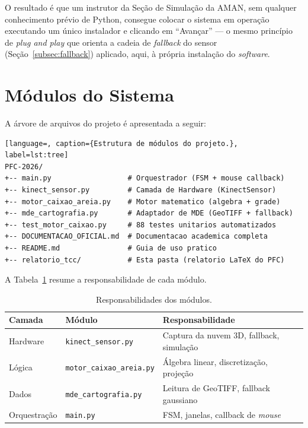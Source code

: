 \noindent O resultado é que um instrutor da Seção de Simulação da AMAN,
sem qualquer conhecimento prévio de Python, consegue colocar o sistema
em operação executando um único instalador e clicando em ``Avançar'' —
o mesmo princípio de \textit{plug and play} que orienta a cadeia de
\textit{fallback} do sensor (Seção~\ref{subsec:fallback}) aplicado,
aqui, à própria instalação do \textit{software}.

\section{Módulos do Sistema}
\label{sec:modulos}

A árvore de arquivos do projeto é apresentada a seguir:

\begin{lstlisting}[language=, caption={Estrutura de módulos do projeto.}, label=lst:tree]
PFC-2026/
+-- main.py                  # Orquestrador (FSM + mouse callback)
+-- kinect_sensor.py         # Camada de Hardware (KinectSensor)
+-- motor_caixao_areia.py    # Motor matematico (algebra + grade)
+-- mde_cartografia.py       # Adaptador de MDE (GeoTIFF + fallback)
+-- test_motor_caixao.py     # 88 testes unitarios automatizados
+-- DOCUMENTACAO_OFICIAL.md  # Documentacao academica completa
+-- README.md                # Guia de uso pratico
+-- relatorio_tcc/           # Esta pasta (relatorio LaTeX do PFC)
\end{lstlisting}

A Tabela~\ref{tab:modulos} resume a responsabilidade de cada módulo.

\begin{table}[!ht]
\centering
\caption{Responsabilidades dos módulos.}
\label{tab:modulos}
\begin{tabular}{lll}
\toprule
\textbf{Camada} & \textbf{Módulo} & \textbf{Responsabilidade} \\
\midrule
Hardware     & \texttt{kinect\_sensor.py}    & Captura da nuvem 3D, fallback, simulação \\
Lógica       & \texttt{motor\_caixao\_areia.py} & Álgebra linear, discretização, projeção \\
Dados        & \texttt{mde\_cartografia.py}  & Leitura de GeoTIFF, fallback gaussiano \\
Orquestração & \texttt{main.py}              & FSM, janelas, callback de \emph{mouse} \\
\bottomrule
\end{tabular}
\end{table}


